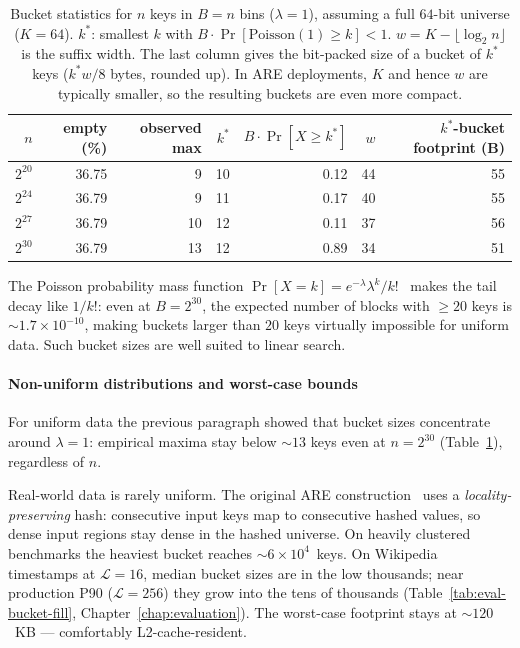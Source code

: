 \begin{table}[H]
    \centering
    \begin{tabular}{@{}rrrrrrr@{}}
        \toprule
        $n$ & empty (\%) & observed max & $k^*$ & $B \cdot \Pr[X \geq k^*]$ & $w$ & $k^*$-bucket footprint (B) \\
        \midrule
        $2^{20}$ & 36.75 & 9  & 10 & 0.12 & 44 & 55 \\
        $2^{24}$ & 36.79 & 9  & 11 & 0.17 & 40 & 55 \\
        $2^{27}$ & 36.79 & 10 & 12 & 0.11 & 37 & 56 \\
        $2^{30}$ & 36.79 & 13 & 12 & 0.89 & 34 & 51 \\
        \bottomrule
    \end{tabular}
    \caption{Bucket statistics for $n$ keys in $B = n$ bins ($\lambda = 1$),
        assuming a full $64$-bit universe ($K = 64$).
        $k^*$: smallest $k$ with $B \cdot \Pr[\mathrm{Poisson}(1) \geq k] < 1$.
        $w = K - \lfloor \log_2 n \rfloor$ is the suffix width.
        The last column gives the bit-packed size of a bucket of $k^*$ keys
        ($k^* w / 8$ bytes, rounded up). In ARE deployments, $K$ and hence
        $w$ are typically smaller, so the resulting buckets are even more
        compact.}
    \label{tab:ere-bucket-stats}
\end{table}

The Poisson probability mass function $\Pr[X = k] = e^{-\lambda}\lambda^k/k!$~\citep[eq.~(6.1)]{feller1968introduction}
makes the tail decay like $1/k!$: even at $B = 2^{30}$, the expected number of
blocks with $\geq 20$ keys is ${\sim}1.7 \times 10^{-10}$, making buckets larger
than $20$ keys virtually impossible for uniform data.
Such bucket sizes are well suited to linear search.

\paragraph{Non-uniform distributions and worst-case bounds}

For uniform data the previous paragraph showed that bucket sizes
concentrate around $\lambda = 1$: empirical maxima stay below
${\sim}13$ keys even at $n = 2^{30}$
(Table~\ref{tab:ere-bucket-stats}), regardless of $n$.

Real-world data is rarely uniform.
The original ARE construction~\citep{goswami2015approximate} uses a \emph{locality-preserving}
hash: consecutive input keys map to consecutive hashed values, so dense
input regions stay dense in the hashed universe.
On heavily clustered benchmarks the heaviest bucket reaches ${\sim}6 \times 10^4$~keys.
On Wikipedia timestamps at $\mathcal{L} = 16$, median bucket
sizes are in the low thousands; near production P90 ($\mathcal{L} = 256$)
they grow into the tens of thousands
(Table~\ref{tab:eval-bucket-fill}, Chapter~\ref{chap:evaluation}).
The worst-case footprint stays at ${\sim}120$~KB --- comfortably
L2-cache-resident.

